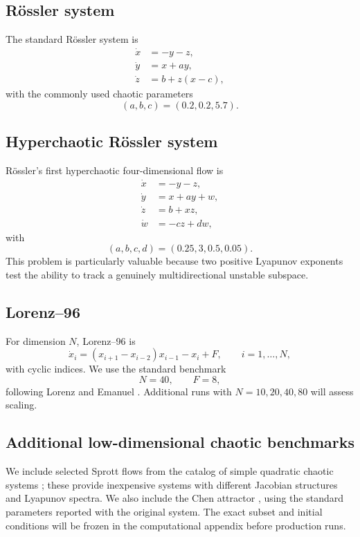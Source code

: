 \documentclass[11pt]{article}
\begin{document}
\subsection{R\"ossler system}
The standard R\"ossler system \cite{Rossler1976} is
\begin{align}
 \dot x&=-y-z,\label{eq:ross1}\\
 \dot y&=x+ay,\label{eq:ross2}\\
 \dot z&=b+z(x-c),\label{eq:ross3}
\end{align}
with the commonly used chaotic parameters
\begin{equation}
 (a,b,c)=(0.2,0.2,5.7).
 \label{eq:rosspar}
\end{equation}

\subsection{Hyperchaotic R\"ossler system}
R\"ossler's first hyperchaotic four-dimensional flow \cite{Rossler1979} is
\begin{align}
 \dot x&=-y-z,\label{eq:hross1}\\
 \dot y&=x+ay+w,\label{eq:hross2}\\
 \dot z&=b+xz,\label{eq:hross3}\\
 \dot w&=-cz+dw,\label{eq:hross4}
\end{align}
with
\begin{equation}
 (a,b,c,d)=(0.25,3,0.5,0.05).
 \label{eq:hrosspar}
\end{equation}
This problem is particularly valuable because two positive Lyapunov exponents test the ability to track a genuinely multidirectional unstable subspace.

\subsection{Lorenz--96}
For dimension $N$, Lorenz--96 is
\begin{equation}
 \dot x_i=(x_{i+1}-x_{i-2})x_{i-1}-x_i+F,
 \qquad i=1,\ldots,N,
 \label{eq:l96}
\end{equation}
with cyclic indices. We use the standard benchmark
\begin{equation}
 N=40,\qquad F=8,
 \label{eq:l96par}
\end{equation}
following Lorenz and Emanuel \cite{LorenzEmanuel1998}. Additional runs with $N=10,20,40,80$ will assess scaling.

\subsection{Additional low-dimensional chaotic benchmarks}
We include selected Sprott flows from the catalog of simple quadratic chaotic systems \cite{Sprott1994}; these provide inexpensive systems with different Jacobian structures and Lyapunov spectra. We also include the Chen attractor \cite{ChenUeta1999}, using the standard parameters reported with the original system. The exact subset and initial conditions will be frozen in the computational appendix before production runs.
\end{document}
